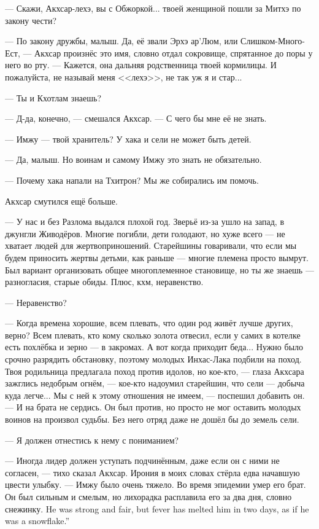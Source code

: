 --- Скажи, Акхсар-лехэ, вы с Обжоркой... твоей женщиной пошли за Митхэ по закону чести?

--- По закону дружбы, малыш.
Да, её звали Эрхэ ар’Люм, или Слишком-Много-Ест, --- Акхсар произнёс это имя, словно отдал сокровище, спрятанное до поры у него во рту.
--- Кажется, она дальняя родственница твоей кормилицы.
И пожалуйста, не называй меня <<лехэ>>, не так уж я и стар...

--- Ты и Кхотлам знаешь?

--- Д-да, конечно, --- смешался Акхсар.
--- С чего бы мне её не знать.

--- Имжу --- твой хранитель?
У хака и сели не может быть детей.

--- Да, малыш.
Но воинам и самому Имжу это знать не обязательно.

--- Почему хака напали на Тхитрон?
Мы же собирались им помочь.

Акхсар смутился ещё больше.

--- У нас и без Разлома выдался плохой год.
Зверьё из-за ушло на запад, в джунгли Живодёров.
Многие погибли, дети голодают, но хуже всего --- не хватает людей для жертвоприношений.
Старейшины говаривали, что если мы будем приносить жертвы детьми, как раньше --- многие племена просто вымрут.
Был вариант организовать общее многоплеменное становище, но ты же знаешь --- разногласия, старые обиды.
Плюс, кхм, неравенство.

--- Неравенство?

--- Когда времена хорошие, всем плевать, что один род живёт лучше других, верно?
Всем плевать, кто кому сколько золота отвесил, если у самих в котелке есть похлёбка и зерно --- в закромах.
А вот когда приходит беда...
Нужно было срочно разрядить обстановку, поэтому молодых Инхас-Лака подбили на поход.
Твоя родильница предлагала поход против идолов, но кое-кто, --- глаза Акхсара зажглись недобрым огнём, --- кое-кто надоумил старейшин, что сели --- добыча куда легче...
Мы с ней к этому отношения не имеем, --- поспешил добавить он.
--- И на брата не сердись.
Он был против, но просто не мог оставить молодых воинов на произвол судьбы.
Без него отряд даже не дошёл бы до земель сели.

--- Я должен отнестись к нему с пониманием?

--- Иногда лидер должен уступать подчинённым, даже если он с ними не согласен, --- тихо сказал Акхсар.
Ирония в моих словах стёрла едва начавшую цвести улыбку.
--- Имжу было очень тяжело.
Во время эпидемии умер его брат.
{Он был сильным и смелым, но лихорадка расплавила его за два дня, словно снежинку.}
{He was strong and fair, but fever has melted him in two days, as if he was a snowflake.''}

